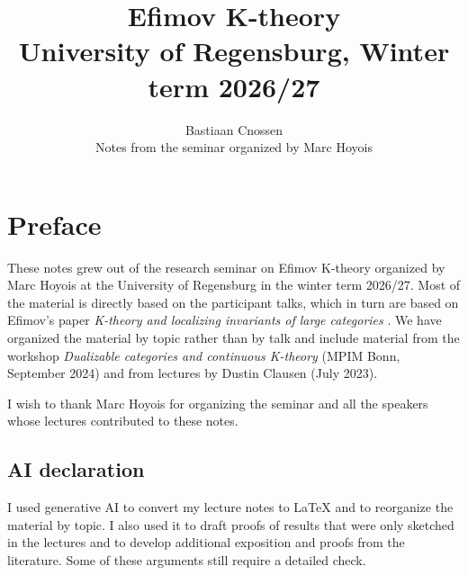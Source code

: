 \documentclass[11pt]{book}
\begin{document}

	\title{Efimov K-theory\\ \vspace{10pt}
	\Large University of Regensburg, Winter term 2026/27}
	\author{\large Bastiaan Cnossen \\ Notes from the seminar organized by Marc Hoyois}

	\maketitle


	\begin{KeepFromToc}
		\tableofcontents
	\end{KeepFromToc}

	\titlespacing*{\chapter}{0pt}{20pt}{15pt}

	\chapter*{Preface}

	These notes grew out of the research seminar on Efimov K-theory organized by Marc Hoyois at the University of Regensburg in the winter term 2026/27. Most of the material is directly based on the participant talks, which in turn are based on Efimov's paper \emph{K-theory and localizing invariants of large categories} \cite{Efimov_Large_Categories}. We have organized the material by topic rather than by talk and include material from the workshop \emph{Dualizable categories and continuous K-theory} (MPIM Bonn, September 2024) and from lectures by Dustin Clausen (July 2023).
	
	I wish to thank Marc Hoyois for organizing the seminar and all the speakers whose lectures contributed to these notes.

	\section*{AI declaration}

	I used generative AI to convert my lecture notes to LaTeX and to reorganize the material by topic. I also used it to draft proofs of results that were only sketched in the lectures and to develop additional exposition and proofs from the literature. Some of these arguments still require a detailed check.
\end{document}
